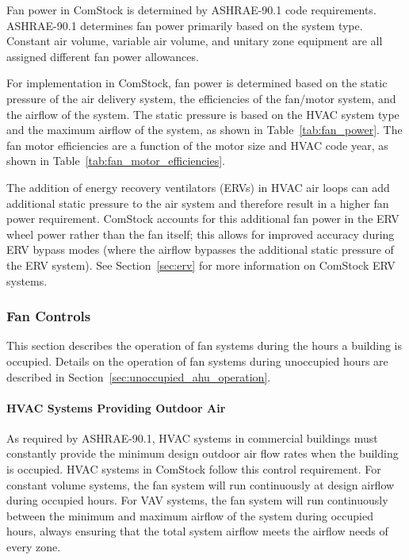 Fan power in ComStock is determined by ASHRAE-90.1 code requirements. ASHRAE-90.1 determines fan power primarily based on the system type. Constant air volume, variable air volume, and unitary zone equipment are all assigned different fan power allowances.

For implementation in ComStock, fan power is determined based on the static pressure of the air delivery system, the efficiencies of the fan/motor system, and the airflow of the system. The static pressure is based on the HVAC system type and the maximum airflow of the system, as shown in Table~\ref{tab:fan_power}. The fan motor efficiencies are a function of the motor size and HVAC code year, as shown in Table~\ref{tab:fan_motor_efficiencies}.

The addition of energy recovery ventilators (ERVs) in HVAC air loops can add additional static pressure to the air system and therefore result in a higher fan power requirement. ComStock accounts for this additional fan power in the ERV wheel power rather than the fan itself; this allows for improved accuracy during ERV bypass modes (where the airflow bypasses the additional static pressure of the ERV system). See Section~\ref{sec:erv} for more information on ComStock ERV systems.




\subsubsection{Fan Controls}

This section describes the operation of fan systems during the hours a building is occupied. Details on the operation of fan systems during unoccupied hours are described in Section~\ref{sec:unoccupied_ahu_operation}.

\paragraph{HVAC Systems Providing Outdoor Air}

As required by ASHRAE-90.1, HVAC systems in commercial buildings must constantly provide the minimum design outdoor air flow rates when the building is occupied. HVAC systems in ComStock follow this control requirement. For constant volume systems, the fan system will run continuously at design airflow during occupied hours. For VAV systems, the fan system will run continuously between the minimum and maximum airflow of the system during occupied hours, always ensuring that the total system airflow meets the airflow needs of every zone.

